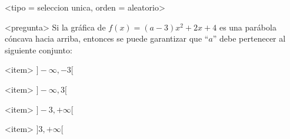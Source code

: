 <tipo = seleccion unica, orden = aleatorio>

<pregunta>
Si la gr\'afica de $f(x) = (a -3)x^2+2x +4$ es una par\'abola c\'oncava hacia arriba, entonces se puede garantizar que ``$a$'' debe pertenecer al siguiente conjunto:


<item>
$]{-}\infty, -3[$

<item>
$]{-}\infty, 3[$

<item>
$]-3, +\infty[$

<item>
$]3, +\infty[$



